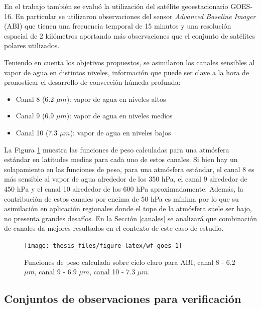 \documentclass[12pt,oneside,a4paper]{reedthesis}
\providecommand{\tightlist}{%
  \setlength{\itemsep}{0pt}\setlength{\parskip}{0pt}}
\begin{document}
En el trabajo también se evaluó la utilización del satélite geoestacionario GOES-16. En particular se utilizaron observaciones del sensor \emph{Advanced Baseline Imager} (ABI) que tienen una frecuencia temporal de 15 minutos y una resolución espacial de 2 kilómetros aportando más observaciones que el conjunto de satélites polares utilizados.

Teniendo en cuenta los objetivos propuestos, se asimilaron los canales sensibles al vapor de agua en distintos niveles, información que puede ser clave a la hora de pronosticar el desarrollo de convección húmeda profunda:
\begin{itemize}
\tightlist
\item
  Canal 8 (6.2 \(\mu m\)): vapor de agua en niveles altos
\item
  Canal 9 (6.9 \(\mu m\)): vapor de agua en niveles medios
\item
  Canal 10 (7.3 \(\mu m\)): vapor de agua en niveles bajos
\end{itemize}
La Figura \ref{fig:wf-goes} muestra las funciones de peso calculadas para una atmósfera estándar en latitudes medias para cada uno de estos canales. Si bien hay un solapamiento en las funciones de peso, para una atmósfera estándar, el canal 8 es más sensible al vapor de agua alrededor de los 350 hPa, el canal 9 alrededor de 450 hPa y el canal 10 alrededor de los 600 hPa aproximadamente. Además, la contribución de estos canales por encima de 50 hPa es mínima por lo que su asimilación en aplicación regionales donde el tope de la atmósfera suele ser bajo, no presenta grandes desafíos. En la Sección \ref{canales} se analizará que combinación de canales da mejores resultados en el contexto de este caso de estudio.


\begin{figure}

{\centering \texttt{[image: thesis\_files/figure-latex/wf-goes-1]} 

}

\caption{Funciones de peso calculada sobre cielo claro para ABI, canal 8 - 6.2 \(\mu m\), canal 9 - 6.9 \(\mu m\), canal 10 - 7.3 \(\mu m\).}\label{fig:wf-goes}
\end{figure}
\hypertarget{conjuntos-de-observaciones-para-verificaciuxf3n}{%
\subsection{Conjuntos de observaciones para verificación}\label{conjuntos-de-observaciones-para-verificaciuxf3n}}
\end{document}

